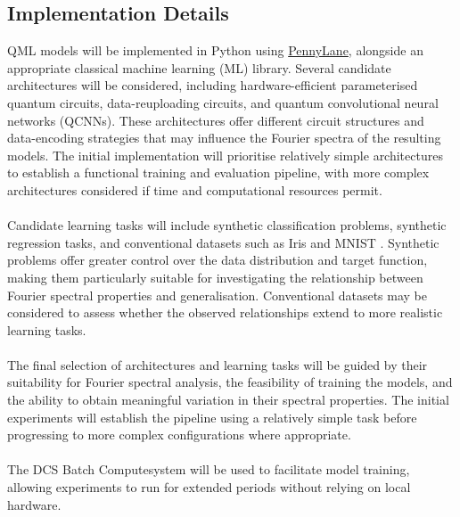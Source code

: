\subsection{Implementation Details}
{\large
\raggedright
QML models will be implemented in Python using \href{https://pennylane.ai}{\color{blue} PennyLane}, alongside an appropriate classical machine learning (ML) library. Several candidate architectures will be considered, including hardware-efficient parameterised quantum circuits, data-reuploading circuits, and quantum convolutional neural networks (QCNNs). These architectures offer different circuit structures and data-encoding strategies that may influence the Fourier spectra of the resulting models. The initial implementation will prioritise relatively simple architectures to establish a functional training and evaluation pipeline, with more complex architectures considered if time and computational resources permit.\\
~\\
Candidate learning tasks will include synthetic classification problems, synthetic regression tasks, and conventional datasets such as Iris \cite{Fisher36} and MNIST \cite{LeCun98}. Synthetic problems offer greater control over the data distribution and target function, making them particularly suitable for investigating the relationship between Fourier spectral properties and generalisation. Conventional datasets may be considered to assess whether the observed relationships extend to more realistic learning tasks.\\
~\\
The final selection of architectures and learning tasks will be guided by their suitability for Fourier spectral analysis, the feasibility of training the models, and the ability to obtain meaningful variation in their spectral properties. The initial experiments will establish the pipeline using a relatively simple task before progressing to more complex configurations where appropriate.\\
~\\
The DCS Batch Compute\footnotemark[1] system will be used to facilitate model training, allowing experiments to run for extended periods without relying on local hardware.
}

